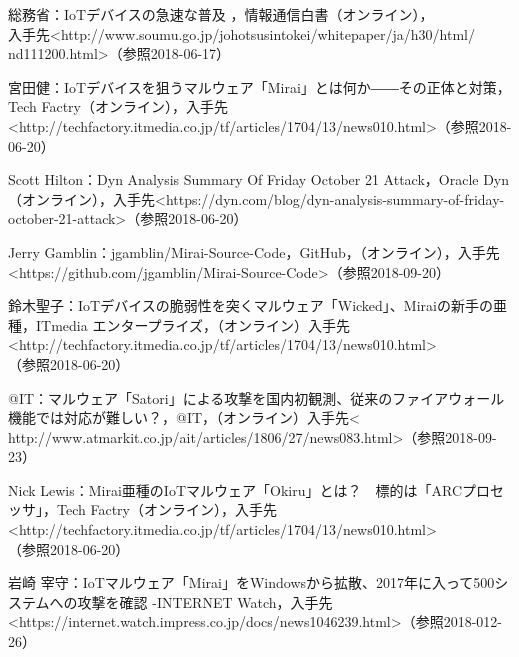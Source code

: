 
\begin{thebibliography}{30}
		総務省：IoTデバイスの急速な普及 ，情報通信白書（オンライン），\\入手先\textless http://www.soumu.go.jp/johotsusintokei/whitepaper/ja/h30/html/ \\nd111200.html\textgreater（参照2018-06-17）
    
        宮田健：IoTデバイスを狙うマルウェア「Mirai」とは何か――その正体と対策，Tech Factry（オンライン），入手先\textless http:\slash\slash{}techfactory.itmedia.co.jp\slash{}tf\slash{}articles\slash{}1704\slash{}13\slash{}news010.html\textgreater（参照2018-06-20）

       Scott Hilton：Dyn Analysis Summary Of Friday October 21 Attack，Oracle Dyn（オンライン），入手先\textless https:\slash\slash{}dyn.com\slash{}blog\slash{}dyn-analysis-summary-of-friday-october-21-attack\textgreater （参照2018-06-20）
       
       Jerry Gamblin：jgamblin/Mirai-Source-Code，GitHub，（オンライン），入手先\textless https://github.com/jgamblin/Mirai-Source-Code\textgreater（参照2018-09-20）
    
       鈴木聖子：IoTデバイスの脆弱性を突くマルウェア「Wicked」、Miraiの新手の亜種，ITmedia エンタープライズ，（オンライン）入手先\textless http:\slash\slash{}techfactory.itmedia.co.jp\slash{}tf\slash{}articles\slash{}1704\slash{}13\slash{}news010.html\textgreater\\（参照2018-06-20）
   
       @IT：マルウェア「Satori」による攻撃を国内初観測、従来のファイアウォール機能では対応が難しい？，@IT，（オンライン）入手先\textless 
       http:\slash\slash{}www.atmarkit.co.jp\slash{}ait\slash{}articles\slash{}1806\slash{}27\slash{}news083.html\textgreater （参照2018-09-23）

       Nick Lewis：Mirai亜種のIoTマルウェア「Okiru」とは？　標的は「ARCプロセッサ」，Tech Factry（オンライン），入手先\textless http:\slash\slash{}techfactory.itmedia.co.jp\slash{}tf\slash{}articles\slash{}1704\slash{}13\slash{}news010.html\textgreater\\（参照2018-06-20）

       岩崎 宰守：IoTマルウェア「Mirai」をWindowsから拡散、2017年に入って500システムへの攻撃を確認 -INTERNET Watch，入手先\textless https:\slash\slash{}internet.watch.impress.co.jp\slash{}docs\slash{}news1046239.html\textgreater（参照2018-012-26）
    

\end{thebibliography}
